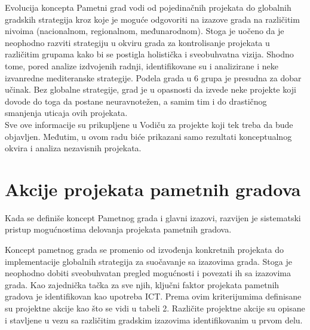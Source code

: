 \documentclass[a4paper,12pt]{article}
\begin{document}
{Evolucija koncepta Pametni grad vodi od pojedinačnih projekata do globalnih gradskih strategija kroz koje je moguće odgovoriti na izazove grada na različitim nivoima (nacionalnom, regionalnom, međunarodnom). Stoga je uočeno da je neophodno razviti strategiju u okviru grada za kontrolisanje projekata u različitim grupama kako bi se postigla holistička i sveobuhvatna vizija. Shodno tome, pored analize izdvojenih radnji, identifikovane su i analizirane i neke izvanredne mediteranske strategije. Podela grada u 6 grupa je presudna za dobar učinak. Bez globalne strategije, grad je u opasnosti da izvede neke projekte koji dovode do toga da postane neuravnotežen, a samim tim i do drastičnog smanjenja uticaja ovih projekata. \\

Sve ove informacije su prikupljene u Vodiču za projekte koji tek treba da bude objavljen. Međutim, u ovom radu biće prikazani samo rezultati konceptualnog okvira i analiza nezavisnih projekata.\\

\section{Akcije projekata pametnih gradova}
Kada se definiše koncept Pametnog grada i glavni izazovi, razvijen je sistematski pristup mogućnostima delovanja projekata pametnih gradova.

Koncept pametnog grada se promenio od izvođenja konkretnih projekata do implementacije globalnih strategija za suočavanje sa izazovima grada. Stoga je neophodno dobiti sveobuhvatan pregled mogućnosti i povezati ih sa izazovima grada. Kao zajednička tačka za sve njih, ključni faktor projekata pametnih gradova je identifikovan kao upotreba ICT. Prema ovim kriterijumima definisane su projektne akcije kao što se vidi u tabeli 2. Različite projektne akcije su opisane i stavljene u vezu sa različitim gradskim izazovima identifikovanim u prvom delu.

}
\end{document}
